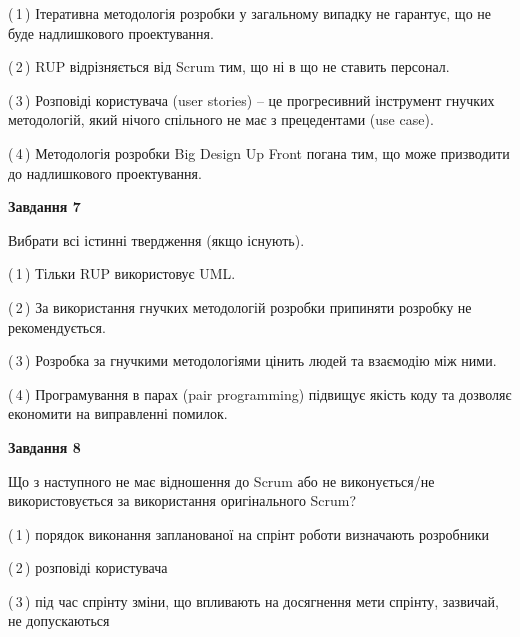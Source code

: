 \documentclass[10pt, ukrainian]{article}
\begin{document}
{\begin {large}
(\,1\,) Ітеративна методологія розробки у загальному випадку не гарантує, що не буде надлишкового проектування. %



(\,2\,) RUP відрізняється від Scrum тим, що ні в що не ставить персонал.%



(\,3\,) Розповіді користувача (user stories) – це прогресивний інструмент гнучких методологій, який нічого спільного не має з прецедентами (use case). %



(\,4\,) Методологія розробки Big Design Up Front погана тим, що може призводити до надлишкового проектування. %


{\begin {center}\textbf{Завдання 7}\end {center}}\par
Вибрати всі істинні твердження (якщо існують).\par
\vspace{2mm}



(\,1\,) Тільки RUP використовує UML.%



(\,2\,) За використання гнучких методологій розробки припиняти розробку не рекомендується. %



(\,3\,) Розробка за гнучкими методологіями цінить людей та взаємодію між ними. %



(\,4\,) Програмування в парах (pair programming) підвищує якість коду та дозволяє економити на виправленні помилок. %


{\begin {center}\textbf{Завдання 8}\end {center}}\par
Що з наступного не має відношення до Scrum або не виконується/не використовується за використання оригінального Scrum?\par
\vspace{2mm}



(\,1\,) порядок виконання запланованої на спрінт роботи визначають розробники%



(\,2\,) розповіді користувача%



(\,3\,) під час спрінту зміни, що впливають на досягнення мети спрінту, зазвичай, не допускаються%




\end{large}}
\end{document}
